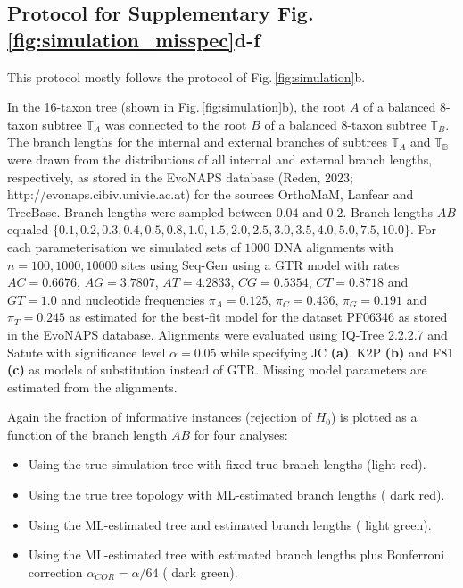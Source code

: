 \subsection*{Protocol for Supplementary Fig.\,\ref{fig:simulation_misspec}d-f}\label{subsec:misspec_16tree}
This protocol mostly follows the protocol of Fig.\,\ref{fig:simulation}b.

\medskip

In the 16-taxon tree (shown in Fig.\,\ref{fig:simulation}b), the root $A$ of a balanced $8$-taxon subtree $\mathbb{T}_A$ was connected to the root $B$ of a balanced $8$-taxon subtree $\mathbb{T}_B$. The branch lengths for the internal and external branches of subtrees $\mathbb{T}_A$ and $\mathbb{T_B}$ were drawn from the distributions of all internal and external branch lengths, respectively, as stored in the EvoNAPS database (Reden, 2023; http://evonaps.cibiv.univie.ac.at) for the sources OrthoMaM, Lanfear and TreeBase. Branch lengths were sampled between $0.04$ and $0.2$. Branch lengths $AB$ equaled $\{0.1, 0.2, 0.3, 0.4, 0.5, 0.8, 1.0, 1.5, 2.0, 2.5, 3.0, 3.5, 4.0, 5.0, 7.5, 10.0\}$. 
For each parameterisation we simulated sets of $1000$ DNA alignments with $n = 100, 1000, 10000$ sites using Seq-Gen \citep[v1.3.4;][]{Rambaut1997} 
using a GTR model with rates $AC=0.6676$, $AG=3.7807$, $AT=4.2833$, $CG=0.5354$, $CT=0.8718$ and $GT=1.0$ and nucleotide frequencies $\pi_A = 0.125$, $\pi_C = 0.436$, $\pi_G = 0.191$ and $\pi_T =0.245$ as estimated for the best-fit model for the dataset PF06346 as stored in the EvoNAPS database.
Alignments were evaluated using IQ-Tree 2.2.2.7 and Satute with significance level $\alpha = 0.05$ while specifying JC \textbf{(a)}, K2P \textbf{(b)} and F81 \textbf{(c)} as models of substitution instead of GTR. Missing model parameters are estimated from the alignments.

\medskip

Again the fraction of informative instances (rejection of $H_0$) is plotted as a function of the branch length $AB$ for four analyses:

\medskip

\begin{itemize}
  \item Using the true simulation tree with fixed true branch lengths ({\color{red}light red}).
  \item Using the true tree topology with ML-estimated branch lengths ({\color{burgundy} dark red}).
  \item Using the ML-estimated tree and estimated branch lengths ({\color{applegreen} light green}).
  \item Using the ML-estimated tree with estimated branch lengths plus Bonferroni correction $\alpha_{COR} = \alpha/64$ ({\color{britishracinggreen} dark green}).
\end{itemize}

